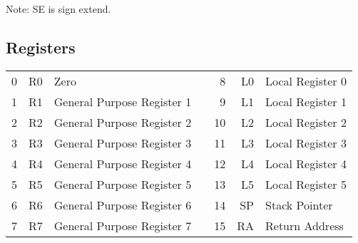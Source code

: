 Note: SE is sign extend.

\subsection{Registers}

\begin{tabular}{rrlp{.1in}rrl}
0 & R0 & Zero                       &&  8 & L0 & Local Register 0 \\
1 & R1 & General Purpose Register 1 &&  9 & L1 & Local Register 1 \\
2 & R2 & General Purpose Register 2 && 10 & L2 & Local Register 2 \\
3 & R3 & General Purpose Register 3 && 11 & L3 & Local Register 3 \\
4 & R4 & General Purpose Register 4 && 12 & L4 & Local Register 4 \\
5 & R5 & General Purpose Register 5 && 13 & L5 & Local Register 5 \\
6 & R6 & General Purpose Register 6 && 14 & SP & Stack Pointer \\
7 & R7 & General Purpose Register 7 && 15 & RA & Return Address \\
\end{tabular}
